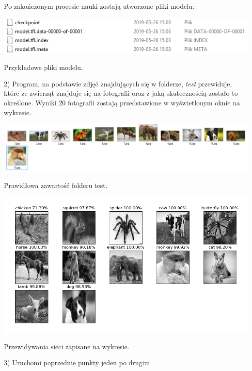 \documentclass[12pt,a4paper]{article}
\begin{document}
    Po zakończonym procesie nauki zostają utworzone pliki modelu:
    \begin{center}
        \includegraphics[scale=1]{4.png}
        \begin{flushright}
            \begin{scriptsize}
            Przykładowe pliki modelu.
            \end{scriptsize}
        \end{flushright}
    \end{center}
    
	2) Program, na podstawie zdjęć znajdujących się w folderze, \textit{test} przewiduje, które ze zwierząt znajduje się na fotografii oraz z jaką skutecznością zostało to określone. Wyniki 20 fotografii zostają przedstawione w wyświetlonym oknie na wykresie.
	\begin{center}
        \includegraphics[scale=0.5]{5.png}
        \begin{flushright}
            \begin{scriptsize}
            Prawidłowa zawartość folderu test.
            \end{scriptsize}
        \end{flushright}
        \includegraphics[scale=0.6]{6.png}
        \begin{flushright}
            \begin{scriptsize}
            Przewidywania sieci zapisane na wykresie.
            \end{scriptsize}
        \end{flushright}
    \end{center}
	3) Uruchomi poprzednie punkty jeden po drugim
	
\end{document}
